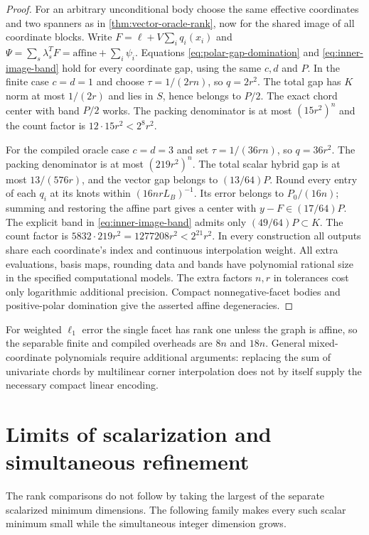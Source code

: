 \begin{proof}
For an arbitrary unconditional body choose the same effective coordinates
and two spanners as in \cref{thm:vector-oracle-rank}, now for the shared
image of all coordinate blocks. Write
$F=\ell+V\sum_iq_i(x_i)$ and
$\Psi=\sum_s\lambda_s^TF=\text{affine}+\sum_i\psi_i$.
Equations \eqref{eq:polar-gap-domination} and
\eqref{eq:inner-image-band} hold for every coordinate gap, using the
same $c,d$ and $P$. In the finite case $c=d=1$ and choose
$\tau=1/(2rn)$, so $q=2r^2$. The total gap has $K$ norm at most
$1/(2r)$ and lies in $S$, hence belongs to $P/2$.
The exact chord center with band $P/2$ works. The packing denominator
is at most $(15r^2)^n$ and the count factor is
$12\cdot15r^2<2^8r^2$.

For the compiled oracle case $c=d=3$ and set $\tau=1/(36rn)$, so
$q=36r^2$. The packing denominator is at most $(219r^2)^n$.
The total scalar hybrid gap is at most $13/(576r)$, and the vector
gap belongs to $(13/64)P$. Round every entry of each $q_i$ at its
knots within $(16nrL_B)^{-1}$. Its error belongs to $P_0/(16n)$;
summing and restoring the affine part gives a center with
$y-F\in(17/64)P$. The explicit band in
\eqref{eq:inner-image-band} admits only $(49/64)P\subset K$.
The count factor is $5832\cdot219r^2=1277208r^2<2^{21}r^2$.
In every construction all outputs share each coordinate's index and
continuous interpolation weight. All extra evaluations, basis maps,
rounding data and bands have polynomial rational size in the specified
computational models. The extra factors $n,r$ in tolerances cost only
logarithmic additional precision. Compact nonnegative-facet bodies and
positive-polar domination give the asserted affine degeneracies.
\end{proof}

For weighted $\ell_1$ error the single facet has rank one unless the
graph is affine, so the separable finite and compiled overheads are
$8n$ and $18n$. General mixed-coordinate polynomials require additional
arguments: replacing the sum of univariate chords by multilinear corner
interpolation does not by itself supply the necessary compact linear
encoding.

\section{Limits of scalarization and simultaneous refinement}
\label{sec:vector-obstructions}

The rank comparisons do not follow by taking the largest of the separate
scalarized minimum dimensions. The following family makes every such
scalar minimum small while the simultaneous integer dimension grows.

